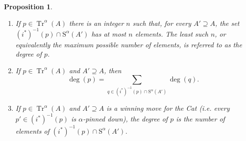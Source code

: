 \documentclass{article}
\newtheorem{prop}[theorem]{Proposition}
\theoremstyle{nonumberplain}
\newcommand{\Stone}{\mathrm{S}}
\DeclareMathOperator{\Tr}{Tr}
\begin{document}
\begin{prop}
\begin{enumerate}
\item\label{item:11} If $p \in \Tr^\alpha(A)$ there is an integer $n$ such that, for every $A' \supseteq A$, the set $(i^*)^{-1}(p) \cap \Stone^\alpha(A')$ has at most $n$ elements. The least such $n$, or equivalently the maximum possible number of elements, is referred to as the \emph{degree of $p$}.

\item\label{item:12} If $p \in \Tr^\alpha(A)$ and $A' \supseteq A$, then
\begin{equation}\label{eq:deg}
\deg(p) = \sum_{q \in (i^*)^{-1}(p) \cap \Stone^\alpha(A')} \deg(q).
\end{equation}

\item\label{item:13} If $p \in \Tr^\alpha(A)$ and $A' \supseteq A$ is a winning move for the Cat (i.e. every $p' \in (i^*)^{-1}(p)$ is $\alpha$-pinned down), the degree of $p$ is the number of elements of $(i^*)^{-1}(p) \cap \Stone^\alpha(A')$.
\end{enumerate}
\end{prop}
\end{document}
